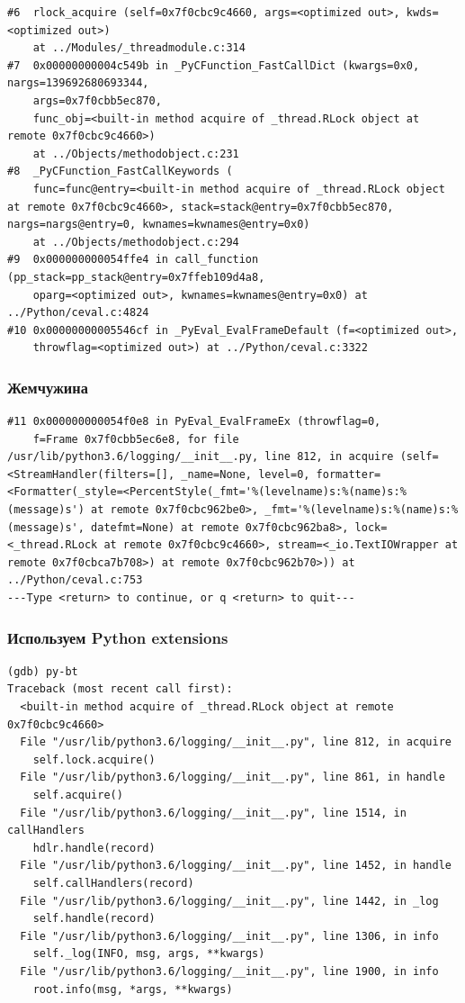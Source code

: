 \documentclass[10pt,pdf,utf8,aspectratio=169,xcolor=dvipsnames,x11names,center]{beamer}
\begin{document}
\begin{frame}[fragile]
  \begin{lstlisting}[language={}]
#6  rlock_acquire (self=0x7f0cbc9c4660, args=<optimized out>, kwds=<optimized out>)
    at ../Modules/_threadmodule.c:314
#7  0x00000000004c549b in _PyCFunction_FastCallDict (kwargs=0x0, nargs=139692680693344, 
    args=0x7f0cbb5ec870, 
    func_obj=<built-in method acquire of _thread.RLock object at remote 0x7f0cbc9c4660>)
    at ../Objects/methodobject.c:231
#8  _PyCFunction_FastCallKeywords (
    func=func@entry=<built-in method acquire of _thread.RLock object at remote 0x7f0cbc9c4660>, stack=stack@entry=0x7f0cbb5ec870, nargs=nargs@entry=0, kwnames=kwnames@entry=0x0)
    at ../Objects/methodobject.c:294
#9  0x000000000054ffe4 in call_function (pp_stack=pp_stack@entry=0x7ffeb109d4a8, 
    oparg=<optimized out>, kwnames=kwnames@entry=0x0) at ../Python/ceval.c:4824
#10 0x00000000005546cf in _PyEval_EvalFrameDefault (f=<optimized out>, 
    throwflag=<optimized out>) at ../Python/ceval.c:3322
  \end{lstlisting}
\end{frame}

\begin{frame}[fragile]
  \frametitle{Жемчужина}
  \begin{lstlisting}[language={}]
#11 0x000000000054f0e8 in PyEval_EvalFrameEx (throwflag=0, 
    f=Frame 0x7f0cbb5ec6e8, for file /usr/lib/python3.6/logging/__init__.py, line 812, in acquire (self=<StreamHandler(filters=[], _name=None, level=0, formatter=<Formatter(_style=<PercentStyle(_fmt='%(levelname)s:%(name)s:%(message)s') at remote 0x7f0cbc962be0>, _fmt='%(levelname)s:%(name)s:%(message)s', datefmt=None) at remote 0x7f0cbc962ba8>, lock=<_thread.RLock at remote 0x7f0cbc9c4660>, stream=<_io.TextIOWrapper at remote 0x7f0cbca7b708>) at remote 0x7f0cbc962b70>)) at ../Python/ceval.c:753
---Type <return> to continue, or q <return> to quit---
  \end{lstlisting}
\end{frame}

\begin{frame}[fragile]
  \frametitle{Используем Python extensions}
  \begin{lstlisting}[language={}]
(gdb) py-bt
Traceback (most recent call first):
  <built-in method acquire of _thread.RLock object at remote 0x7f0cbc9c4660>
  File "/usr/lib/python3.6/logging/__init__.py", line 812, in acquire
    self.lock.acquire()
  File "/usr/lib/python3.6/logging/__init__.py", line 861, in handle
    self.acquire()
  File "/usr/lib/python3.6/logging/__init__.py", line 1514, in callHandlers
    hdlr.handle(record)
  File "/usr/lib/python3.6/logging/__init__.py", line 1452, in handle
    self.callHandlers(record)
  File "/usr/lib/python3.6/logging/__init__.py", line 1442, in _log
    self.handle(record)
  File "/usr/lib/python3.6/logging/__init__.py", line 1306, in info
    self._log(INFO, msg, args, **kwargs)
  File "/usr/lib/python3.6/logging/__init__.py", line 1900, in info
    root.info(msg, *args, **kwargs)
  \end{lstlisting}
\end{frame}
\end{document}
